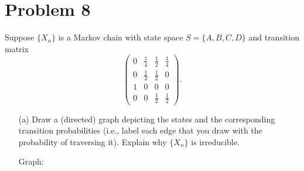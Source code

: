 \documentclass[11pt]{article}
\begin{document}
\section*{Problem 8}
\begin{problem}
    Suppose \( \{X_n\} \) is a Markov chain with state space \( S = \{A, B, C, D\} \) and transition matrix
\[
\begin{pmatrix}
0 & \frac{1}{4} & \frac{1}{2} & \frac{1}{4} \\
0 & \frac{1}{2} & \frac{1}{2} & 0 \\
1 & 0 & 0 & 0 \\
0 & 0 & \frac{1}{2} & \frac{1}{2}
\end{pmatrix}.
\]

\begin{enumerate}
    \item[(a)] Draw a (directed) graph depicting the states and the corresponding transition probabilities (i.e., label each edge that you draw with the probability of traversing it). Explain why \( \{X_n\} \) is irreducible.
    \begin{solution}
Graph:
        \begin{center}
\end{center}
\end{solution}
\end{enumerate}
\end{problem}
\end{document}
